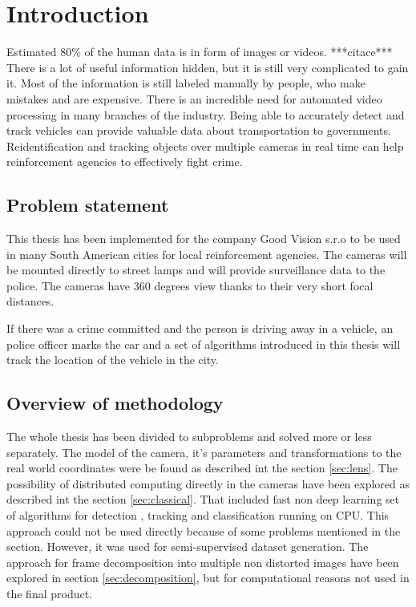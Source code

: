 \documentclass[a4paper,12pt,titlepage]{article}
\numberwithin{figure}{section}
\begin{document}

\section{Introduction}
Estimated 80\% of the human data is in form of images or videos. ***citace*** There is a lot of useful information hidden, but it is still very complicated to gain it. Most of the information is still labeled manually by people, who make mistakes and are expensive. There is an incredible need for automated video processing in many branches of the industry. Being able to accurately detect and track vehicles can provide valuable data about transportation to governments. Reidentification and tracking objects over multiple cameras in real time can help reinforcement agencies to effectively fight crime. 

\subsection{Problem statement}
This thesis has been implemented for the company Good Vision s.r.o to be used in many South American cities for local reinforcement agencies. The cameras will be mounted directly to street lamps and will provide surveillance data to the police. The cameras have 360 degrees view thanks to their very short focal distances. 

If there was a crime committed and the person is driving away in a vehicle, an police officer marks the car and a set of algorithms introduced in this thesis will track the location of the vehicle in the city.

\subsection{Overview of methodology}

The whole thesis has been divided to subproblems and solved more or less separately. The model of the camera, it's parameters and transformations to the real world coordinates were be found as described int the section \ref{sec:lens}. The possibility of distributed computing directly in the cameras have been explored as described int the section \ref{sec:classical}. That included fast non deep learning set of algorithms for detection \cite{piccardi2004background}, tracking \cite{optical-flow} and classification \cite{haar} running on CPU. This approach could not be used directly because of some problems mentioned in the section. However, it was used for semi-supervised dataset generation. The approach for frame decomposition into multiple non distorted images have been explored in section \ref{sec:decomposition}, but for computational reasons not used in the final product. 
\end{document}
